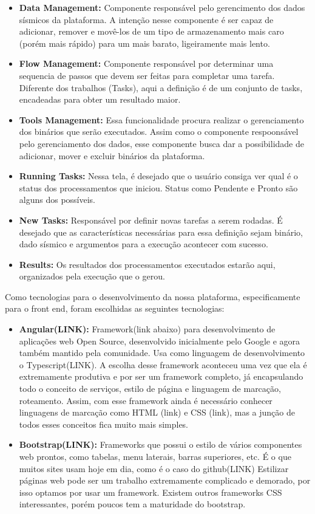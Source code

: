\documentclass[11pt,twoside]{article}
\begin{document}
\begin{itemize}
  \item \textbf{Data Management:} Componente responsável pelo gerencimento dos dados sísmicos da plataforma. A intenção nesse componente é ser capaz de adicionar, remover e 
  movê-los de um tipo de armazenamento mais caro (porém mais rápido) para um mais barato, ligeiramente mais lento. 
  \item \textbf{Flow Management:} Componente responsável por determinar uma sequencia de passos que devem ser feitas para completar uma tarefa. Diferente dos trabalhos (Tasks),
  aqui a definição é de um conjunto de tasks, encadeadas para obter um resultado maior.
  \item \textbf{Tools Management:} Essa funcionalidade procura realizar o gerenciamento dos binários que serão executados. Assim como o componente respoonsável pelo gerenciamento
  dos dados, esse componente busca dar a possibilidade de adicionar, mover e excluir binários da plataforma.
  \item \textbf{Running Tasks:} Nessa tela, é desejado que o usuário consiga ver qual é o status dos processamentos que iniciou. Status como Pendente e Pronto são alguns dos 
  possíveis.
  \item \textbf{New Tasks:} Responsável por definir novas tarefas a serem rodadas. É desejado que as características necessárias para essa definição sejam binário, dado sísmico 
  e argumentos para a execução acontecer com sucesso. 
  \item \textbf{Results:} Os resultados dos processamentos executados estarão aqui, organizados pela execução que o gerou.
\end{itemize}

Como tecnologias para o desenvolvimento da nossa plataforma, especificamente para o front end, foram escolhidas as seguintes tecnologias:

\begin{itemize}
  \item \textbf{Angular(LINK):} Framework(link abaixo) para desenvolvimento de aplicações web Open Source, desenvolvido inicialmente pelo Google e agora também mantido pela comunidade. Usa como linguagem de desenvolvimento o
  Typescript(LINK). A escolha desse framework aconteceu uma vez que ela é extremamente produtiva e por ser um framework completo, já encapsulando todo o conceito de serviços, estilo de página e 
  linguagem de marcação, roteamento. Assim, com esse framework ainda é necessário conhecer linguagens de marcação como HTML (link) e CSS (link), mas a junção de todos esses conceitos fica muito mais simples.
  \item \textbf{Bootstrap(LINK):} Frameworks que possui o estilo de vários componentes web prontos, como tabelas, menu laterais, barras superiores, etc. É o que muitos sites usam hoje em dia, como é o caso do github(LINK)
  Estilizar páginas web pode ser um trabalho extremamente complicado e demorado, por isso optamos por usar um framework. Existem outros frameworks CSS interessantes, porém poucos tem a maturidade do bootstrap.
\end{itemize}
\end{document}
